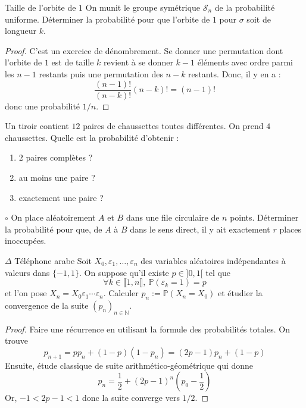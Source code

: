 \documentclass[french,a4paper]{article}
\renewcommand{\P}{\mathbb{P}}
\newcommand{\N}{\mathbb{N}}
\theoremstyle{plain}
\theoremstyle{definition}
\theoremstyle{remark}
\begin{document}
\begin{ex}{Taille de l'orbite de $1$}
	On munit le groupe symétrique $\mathcal{S}_n$ de la probabilité uniforme. Déterminer la probabilité pour que l'orbite de $1$ pour $\sigma$ soit de longueur $k$.
\end{ex}
\begin{proof}
	C'est un exercice de dénombrement. Se donner une permutation dont l'orbite de $1$ est de taille $k$ revient à se donner $k-1$ éléments avec ordre parmi les $n-1$ restants puis une permutation des $n-k$ restants. Donc, il y en a : $$\frac{(n-1)!}{(n-k)!}(n-k)!=(n-1)!$$ donc une probabilité $1/n$.
\end{proof}

\begin{ex}{}
	Un tiroir contient $12$ paires de chaussettes toutes différentes. On prend $4$ chaussettes. Quelle est la probabilité d'obtenir :
	\begin{enumerate}
		\item $2$ paires complètes ?
		\item au moins une paire ?
		\item exactement une paire ?
	\end{enumerate}
\end{ex}

\begin{ex}{$\circ$}
	On place aléatoirement $A$ et $B$ dans une file circulaire de $n$ points. Déterminer la probabilité pour que, de $A$ à $B$ dans le sens direct, il y ait exactement $r$ places inoccupées.
\end{ex}

\begin{ex}{$\Delta$ Téléphone arabe}
	Soit $X_0,\varepsilon_1,\ldots,\varepsilon_n$ des variables aléatoires indépendantes à valeurs dans $\{-1,1\}$. On suppose qu'il existe $p\in]0,1[$ tel que $$\forall k\in\llbracket1,n\rrbracket,\ \P(\varepsilon_k=1)=p$$ et l'on pose $X_n=X_0\varepsilon_1\cdots\varepsilon_n$. Calculer $p_n:=\P(X_n=X_0)$ et étudier la convergence de la suite $(p_n)_{n\in \N}$.
\end{ex}
\begin{proof}
	Faire une récurrence en utilisant la formule des probabilités totales. On trouve $$p_{n+1}=pp_n+(1-p)(1-p_n)=(2p-1)p_n+(1-p)$$ Ensuite, étude classique de suite arithmético-géométrique qui donne $$p_n=\frac{1}{2}+(2p-1)^n\left(p_0-\frac{1}{2}\right)$$ Or, $-1<2p-1<1$ donc la suite converge vers $1/2$.
\end{proof}
\end{document}
